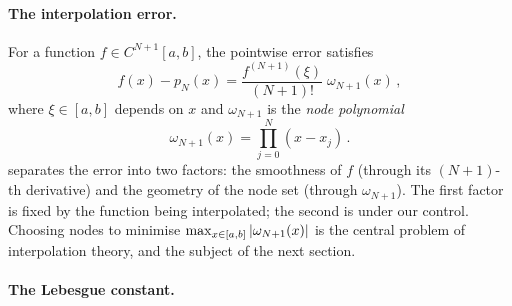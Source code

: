 \paragraph{The interpolation error.}

For a function $f \in C^{N+1}[a,b]$, the pointwise error satisfies
%
\begin{equation}
  f(x) - p_N(x)
    = \frac{f^{(N+1)}(\xi)}{(N+1)!}\;\omega_{N+1}(x) \,,
  \label{eq:interp-error}
\end{equation}
%
where $\xi \in [a,b]$ depends on $x$ and $\omega_{N+1}$ is the
\emph{node polynomial}
%
\begin{equation}
  \omega_{N+1}(x)
    = \prod_{j=0}^{N} (x - x_j) \,.
  \label{eq:node-polynomial}
\end{equation}
%
 separates the error into two factors: the
smoothness of $f$ (through its $(N+1)$-th derivative) and the
geometry of the node set (through $\omega_{N+1}$).  The first factor
is fixed by the function being interpolated; the second is under our
control.  Choosing nodes to minimise $\max_{x \in [a,b]}
\left\lvert \omega_{N+1}(x) \right\rvert$ is the central problem of interpolation
theory, and the subject of the next section.

\paragraph{The Lebesgue constant.}

